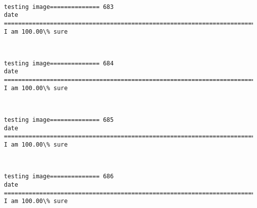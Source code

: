 \documentclass[11pt]{article}
\begin{document}
    \begin{center}
    \end{center}
    { \hspace*{\fill} \\}
    
    \begin{Verbatim}[commandchars=\\\{\}]
testing image============== 683
date
============================================================================
I am 100.00\% sure

    \end{Verbatim}

    \begin{center}
    \end{center}
    { \hspace*{\fill} \\}
    
    \begin{Verbatim}[commandchars=\\\{\}]
testing image============== 684
date
============================================================================
I am 100.00\% sure

    \end{Verbatim}

    \begin{center}
    \end{center}
    { \hspace*{\fill} \\}
    
    \begin{Verbatim}[commandchars=\\\{\}]
testing image============== 685
date
============================================================================
I am 100.00\% sure

    \end{Verbatim}

    \begin{center}
    \end{center}
    { \hspace*{\fill} \\}
    
    \begin{Verbatim}[commandchars=\\\{\}]
testing image============== 686
date
============================================================================
I am 100.00\% sure

    \end{Verbatim}
\end{document}
